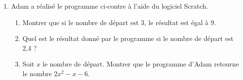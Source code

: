 \begin{minipage}{9cm}
\begin{enumerate}
\item Adam a réalisé le programme ci-contre à l’aide du logiciel Scratch.
\begin{enumerate}
	\item Montrer que si le nombre de départ est 3, le résultat est égal à 9.
	\item Quel est le résultat donné par le programme si le nombre de départ est 2,4 ?
	\item Soit $x$ le nombre de départ. Montrer que le programme d’Adam retourne le nombre $2x^2 - x - 6$.
\end{enumerate}
\end{enumerate}
\end{minipage}
\hfill
\begin{minipage}{9cm}
\begin{scratch}[scale=0.75,print]
							        	\end{scratch}
\end{minipage}

